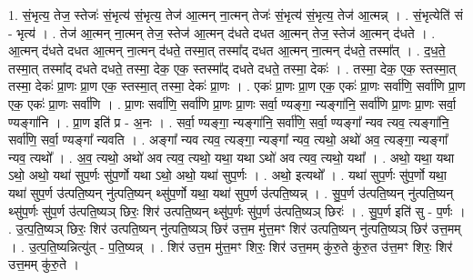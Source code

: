 \documentclass[17pt]{extarticle}
\begin{document}
1. सं॒भृत्य॒ तेज॒ स्तेजः॑ सं॒भृत्य॑ सं॒भृत्य॒ तेज॑ आ॒त्मन् ना॒त्मन् तेजः॑ सं॒भृत्य॑ सं॒भृत्य॒ तेज॑ आ॒त्मन्न् । . सं॒भृत्येति॑ सं - भृत्य॑ । . तेज॑ आ॒त्मन् ना॒त्मन् तेज॒ स्तेज॑ आ॒त्मन् द॑धते दधत आ॒त्मन् तेज॒ स्तेज॑ आ॒त्मन् द॑धते । . आ॒त्मन् द॑धते दधत आ॒त्मन् ना॒त्मन् द॑धते॒ तस्मा॒त् तस्मा᳚द् दधत आ॒त्मन् ना॒त्मन् द॑धते॒ तस्मा᳚त् । . द॒ध॒ते॒ तस्मा॒त् तस्मा᳚द् दधते दधते॒ तस्मा॒ देक॒ एक॒ स्तस्मा᳚द् दधते दधते॒ तस्मा॒ देकः॑ । . तस्मा॒ देक॒ एक॒ स्तस्मा॒त् तस्मा॒ देकः॑ प्रा॒णः प्रा॒ण एक॒ स्तस्मा॒त् तस्मा॒ देकः॑ प्रा॒णः । . एकः॑ प्रा॒णः प्रा॒ण एक॒ एकः॑ प्रा॒णः सर्वा॑णि॒ सर्वा॑णि प्रा॒ण एक॒ एकः॑ प्रा॒णः सर्वा॑णि । . प्रा॒णः सर्वा॑णि॒ सर्वा॑णि प्रा॒णः प्रा॒णः सर्वा॒ ण्यङ्गा॒ न्यङ्गा॑नि॒ सर्वा॑णि प्रा॒णः प्रा॒णः सर्वा॒ ण्यङ्गा॑नि । . प्रा॒ण इति॑ प्र - अ॒नः । . सर्वा॒ ण्यङ्गा॒ न्यङ्गा॑नि॒ सर्वा॑णि॒ सर्वा॒ ण्यङ्गा᳚ न्यव त्यव॒ त्यङ्गा॑नि॒ सर्वा॑णि॒ सर्वा॒ ण्यङ्गा᳚ न्यवति । . अङ्गा᳚ न्यव त्यव॒ त्यङ्गा॒ न्यङ्गा᳚ न्यव॒ त्यथो॒ अथो॑ अव॒ त्यङ्गा॒ न्यङ्गा᳚ न्यव॒ त्यथो᳚ । . अ॒व॒ त्यथो॒ अथो॑ अव त्यव॒ त्यथो॒ यथा॒ यथा ऽथो॑ अव त्यव॒ त्यथो॒ यथा᳚ । . अथो॒ यथा॒ यथा ऽथो॒ अथो॒ यथा॑ सुप॒र्णः सु॑प॒र्णो यथा ऽथो॒ अथो॒ यथा॑ सुप॒र्णः । . अथो॒ इत्यथो᳚ । . यथा॑ सुप॒र्णः सु॑प॒र्णो यथा॒ यथा॑ सुप॒र्ण उ॑त्पति॒ष्यन् नु॑त्पति॒ष्यन् थ्सु॑प॒र्णो यथा॒ यथा॑ सुप॒र्ण उ॑त्पति॒ष्यन्न् । . सु॒प॒र्ण उ॑त्पति॒ष्यन् नु॑त्पति॒ष्यन् थ्सु॑प॒र्णः सु॑प॒र्ण उ॑त्पति॒ष्यञ् छिरः॒ शिर॑ उत्पति॒ष्यन् थ्सु॑प॒र्णः सु॑प॒र्ण उ॑त्पति॒ष्यञ् छिरः॑ । . सु॒प॒र्ण इति॑ सु - प॒र्णः । . उ॒त्प॒ति॒ष्यञ् छिरः॒ शिर॑ उत्पति॒ष्यन् नु॑त्पति॒ष्यञ् छिर॑ उत्त॒म मु॑त्त॒मꣳ शिर॑ उत्पति॒ष्यन् नु॑त्पति॒ष्यञ् छिर॑ उत्त॒मम् । . उ॒त्प॒ति॒ष्यन्नित्यु॑त् - प॒ति॒ष्यन्न् । . शिर॑ उत्त॒म मु॑त्त॒मꣳ शिरः॒ शिर॑ उत्त॒मम् कु॑रु॒ते कु॑रु॒त उ॑त्त॒मꣳ शिरः॒ शिर॑ उत्त॒मम् कु॑रु॒ते । \newline
\end{document}
